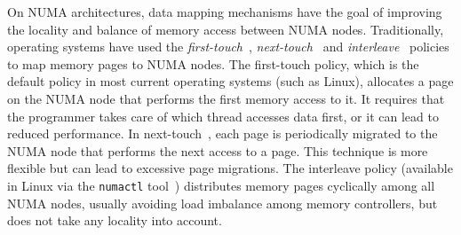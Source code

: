On NUMA architectures, data mapping mechanisms have the goal of improving the locality and balance of memory access between NUMA nodes.
Traditionally, operating systems have used the \emph{first-touch}~\cite{Marchetti1995}, \emph{next-touch}~\cite{Lof2005} and \emph{interleave}~\cite{Kleen2004} policies to map memory pages to NUMA nodes.
The first-touch policy, which is the default policy in most current operating systems (such as Linux), allocates a page on the NUMA node that performs the first memory access to it.
It requires that the programmer takes care of which thread accesses data
first, or it can lead to reduced performance.
In next-touch~\cite{Lof2005}, each page is periodically migrated to the NUMA
node that performs the next access to a page. This technique is more flexible
but can lead to excessive page migrations.
The interleave policy (available in Linux via the \texttt{numactl}
tool~\cite{Kleen2004}) distributes memory pages cyclically among all NUMA nodes,
usually avoiding load imbalance among memory controllers, but does not take any locality into account.

